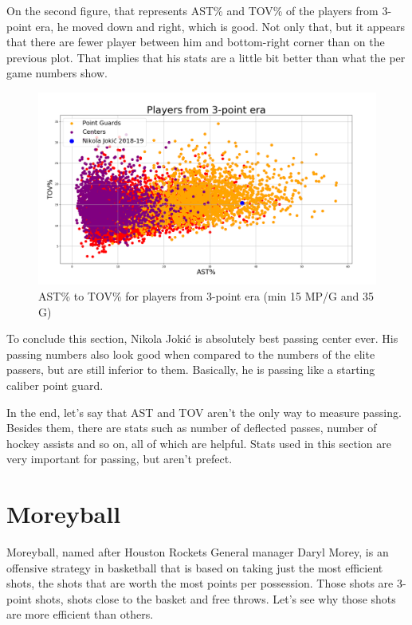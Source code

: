 \documentclass[a4paper]{article}
\begin{document}
On the second figure, that represents AST\% and TOV\% of the players from 3-point era, he moved down and right, which is good. Not only that, but it appears that there are fewer player between him and bottom-right corner than on the previous plot. That implies that his stats are a little bit better than what the per game numbers show.

\begin{figure}[h!]
\begin{center}
\includegraphics[scale=0.30]{ast_tov_pct_3point_era.png}
\end{center}
\caption{AST\% to TOV\% for players from 3-point era (min 15 MP/G and 35 G)}
\label{plt:ast_tov_pct_3p}
\end{figure}

To conclude this section, Nikola Joki\' c is absolutely best passing center ever. His passing numbers also look good when compared to the numbers of the elite passers, but are still inferior to them. Basically, he is passing like a starting caliber point guard.

In the end, let's say that AST and TOV aren't the only way to measure passing. Besides them, there are stats such as number of deflected passes, number of hockey assists and so on, all of which are helpful. Stats used in this section are very important for passing, but aren't prefect.

\pagebreak

\section{Moreyball}
\label{sec:moreyball}

Moreyball, named after Houston Rockets General manager Daryl Morey, is an offensive strategy in basketball that is based on taking just the most efficient shots, the shots that are worth the most points per possession. Those shots are 3-point shots, shots close to the basket and free throws. Let's see why those shots are more efficient than others.
\end{document}
